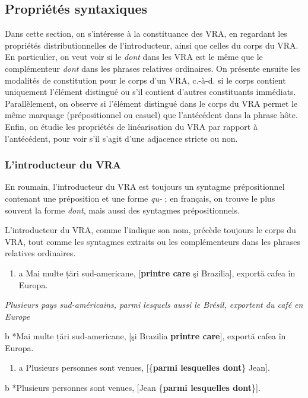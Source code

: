 \subsection{Propriétés syntaxiques}
Dans cette section, on s'intéresse à la constituance des VRA, en regardant les propriétés distributionnelles de l'introducteur, ainsi que celles du corps du VRA. En particulier, on veut voir si le \textit{dont} dans les VRA est le même que le complémenteur \textit{dont} dans les phrases relatives ordinaires. On présente ensuite les modalités de constitution pour le corps d'un VRA, c.-à-d. si le corps contient uniquement l'élément distingué ou s'il contient d'autres constituants immédiats. Parallèlement, on observe si l'élément distingué dans le corps du VRA permet le même marquage (prépositionnel ou casuel) que l'antécédent dans la phrase hôte. Enfin, on étudie les propriétés de linéarisation du VRA par rapport à l'antécédent, pour voir s'il s'agit d'une adjacence stricte ou non.

\subsubsection{L'introducteur du VRA}
En roumain, l'introducteur du VRA est toujours un syntagme prépositionnel contenant une préposition et une forme \textit{qu-} ; en français, on trouve le plus souvent la forme \textit{dont}, mais aussi des syntagmes prépositionnels.

L'introducteur du VRA, comme l'indique son nom, précède toujours le corps du VRA, tout comme les syntagmes extraits ou les complémenteurs dans les phrases relatives ordinaires.


\begin{enumerate}
\item a  Mai multe țări sud-americane, [\textbf{printre care} şi Brazilia], exportă cafea în Europa. 


\end{enumerate}
{\itshape
Plusieurs pays sud-américains, parmi lesquels aussi le Brésil, exportent du café en Europe}

  b  *Mai multe țări sud-americane, [şi Brazilia \textbf{printre care}], exportă cafea în Europa.


\begin{enumerate}
\item a  Plusieurs personnes sont venues, [\{\textbf{parmi lesquelles {\textbar} dont}\} Jean].


\end{enumerate}
  b  *Plusieurs personnes sont venues, [Jean \{\textbf{parmi lesquelles {\textbar} dont}\}].

